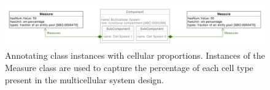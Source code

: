 \begin{figure}[htp]
	\begin{center}
		\includegraphics[width=\textwidth]{uml/cell_ratios}
		\caption[]{Annotating class instances with cellular proportions. Instances of the Measure class are used to capture the percentage of each cell type present in the multicellular system design.
		}
		\label{uml:cell_ratios}
	\end{center}
\end{figure}
